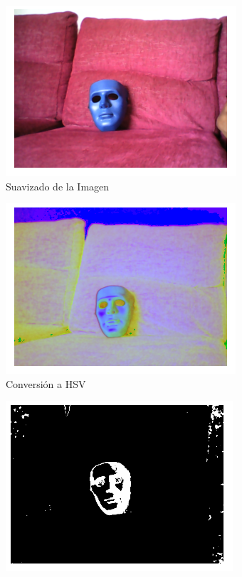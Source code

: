 \begin{figure}
\centering
\begin{subfigure}{.32\textwidth}
  \centering
  \includegraphics[width=.95\linewidth]{figures/cf_smooth.png}
  \caption{Suavizado de la Imagen}
  \label{smooth}
\end{subfigure}
\begin{subfigure}{.32\textwidth}
  \centering
  \includegraphics[width=.95\linewidth]{figures/cf_hsv.png}
  \caption{Conversión a HSV}
  \label{hsv}
\end{subfigure}
\begin{subfigure}{.32\textwidth}
  \centering
  \includegraphics[width=.95\linewidth]{figures/cf_mask.png}

\end{subfigure}
\end{figure}

